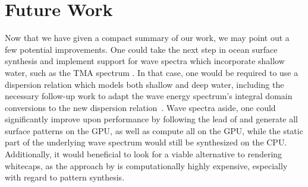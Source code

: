 \section{Future Work}
Now that we have given a compact summary of our work, we may point out a few
potential improvements.
One could take the next step in ocean surface synthesis and implement support
for wave spectra which incorporate shallow water, such as the TMA spectrum
\citep{Hughes:1984}. In that case, one would be required to use a dispersion
relation which models both shallow and deep water, including the necessary
follow-up work to adapt the wave energy spectrum's integral domain conversions
to the new dispersion relation~\citep{Horvath:2015}.
Wave spectra aside, one could significantly improve upon performance by
following the lead of \cite{misc:oceanlightingfft} and generate all
surface patterns on the GPU, as well as compute all \FourierTransforms
on the GPU, while the static part of the underlying wave spectrum
would still be synthesized on the CPU. Additionally, it would beneficial
to look for a viable alternative to rendering whitecaps, as the approach
by \citet{article:whitecaps} is computationally highly expensive,
especially with regard to pattern synthesis.

